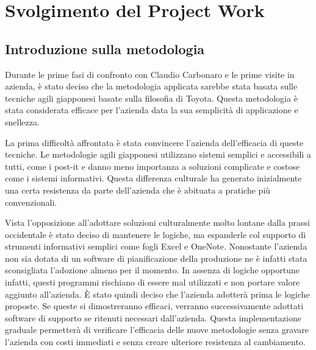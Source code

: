 \chapter{Svolgimento del Project Work}

\section{Introduzione sulla metodologia}
\begin{multicols}{2}
	Durante le prime fasi di confronto con Claudio Carbonaro e le prime visite in azienda, è stato deciso che la metodologia applicata sarebbe stata basata sulle tecniche agili giapponesi basate sulla filosofia di Toyota. Questa metodologia è stata considerata efficace per l’azienda data la sua semplicità di applicazione e snellezza.

	La prima difficoltà affrontata è stata convincere l’azienda dell’efficacia di queste tecniche. Le metodologie agili giapponesi utilizzano sistemi semplici e accessibili a tutti, come i post-it e danno meno importanza a soluzioni complicate e costose come i sistemi informativi. Questa differenza culturale ha generato inizialmente una certa resistenza da parte dell’azienda che è abituata a pratiche più convenzionali.

	Vista l’opposizione all’adottare soluzioni culturalmente molto lontane dalla prassi occidentale è stato deciso di mantenere le logiche, ma espanderle col supporto di strumenti informativi semplici come fogli Excel e OneNote.
	Nonostante l’azienda non sia dotata di un software di pianificazione della produzione ne è infatti stata sconsigliata l’adozione almeno per il momento.
	In assenza di logiche opportune infatti, questi programmi rischiano di essere mal utilizzati e non portare valore aggiunto all’azienda.
	È stato quindi deciso che l'azienda adotterà prima le logiche proposte. Se queste si dimostreranno efficaci, verranno successivamente adottati software di supporto se ritenuti necessari dall’azienda. Questa implementazione graduale permetterà di verificare l’efficacia delle nuove metodologie senza gravare l’azienda con costi immediati e senza creare ulteriore resistenza al cambiamento.
\end{multicols}

\newpage

